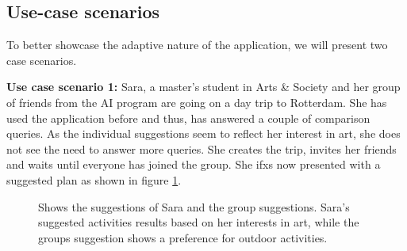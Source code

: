 \documentclass[11pt,a4paper,oneside]{article}
\begin{document}
\subsection{Use-case scenarios}
To better showcase the adaptive nature of the application, we will present two case scenarios.

\textbf{Use case scenario 1:} Sara, a master’s student in Arts \& Society and her group of friends from the AI program are going on a day trip to Rotterdam. She has used the application before and thus, has answered a couple of comparison queries. As the individual suggestions seem to reflect her interest in art, she does not see the need to answer more queries. She creates the trip, invites her friends and waits until everyone has joined the group. She ifxs now presented with a suggested plan as shown in figure \ref{fig:saras_results}.

\begin{figure}[H]
    \centering
    \qquad
    \caption{Shows the suggestions of Sara and the group suggestions. Sara's suggested activities results based on her interests in art, while the groups suggestion shows a preference for outdoor activities.}%
    \label{fig:saras_results}%
\end{figure}
\end{document}
